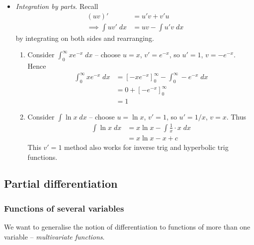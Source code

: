 \documentclass{../template/note}
\begin{document}
    \begin{itemize}[resume]
        \item \emph{Integration by parts}. Recall
        \begin{align*}
            (uv)' &= u'v + v'u \\
            \implies \int uv'\; dx &= uv - \int u'v\; dx
        \end{align*}
        by integrating on both sides and rearranging.

        \begin{enumerate}[label=\protect\circled{\arabic*}]
            \item Consider \(\int_0^\infty xe^{-x} \; dx\) -- choose \(u = x\), \(v' = e^{-x}\), so \(u' = 1\), \(v = -e^{-x}\). Hence
            \begin{align*}
                \int_0^\infty xe^{-x} \; dx &= \left[-xe^{-x}\right]_0^\infty - \int_0^\infty -e^{-x} \; dx \\
                &= 0 + [-e^{-x}]_0^\infty \\
                &= 1
            \end{align*}
            \item Consider \(\int \ln x \; dx\) -- choose \(u = \ln x\), \(v' = 1\), so \(u' = 1/x\), \(v = x\). Thus
            \begin{align*}
                \int \ln x \; dx &= x \ln x - \int \frac{1}{x} \cdot x \; dx \\
                &= x \ln x - x + c
            \end{align*}
            This \(v' = 1\) method also works for inverse trig and hyperbolic trig functions.
            
            
        \end{enumerate}
        
        
        
    \end{itemize}
    
    \subsection{Partial differentiation}

    \subsubsection{Functions of several variables}

    We want to generalise the notion of differentiation to functions of more than one variable -- \emph{multivariate functions}.
\end{document}
